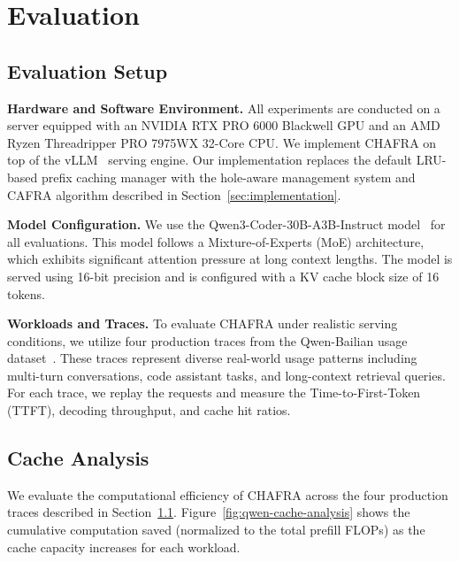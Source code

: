 \documentclass[letterpaper,twocolumn,10pt]{article}
\newcommand{\pgheading}[1]{\indent \textbf{#1.}}
\newcommand{\sys}{CHAFRA\xspace}
\newcommand{\algo}{CAFRA\xspace}
\begin{document}
\section{Evaluation}

\subsection{Evaluation Setup}
\label{sec:evaluation-setup}

\pgheading{Hardware and Software Environment}
All experiments are conducted on a server equipped with an NVIDIA RTX PRO 6000 Blackwell GPU and an AMD Ryzen Threadripper PRO 7975WX 32-Core CPU. We implement \sys on top of the vLLM~\cite{kwon2023efficient} serving engine. Our implementation replaces the default LRU-based prefix caching manager with the hole-aware management system and \algo algorithm described in Section~\ref{sec:implementation}.

\pgheading{Model Configuration}
We use the Qwen3-Coder-30B-A3B-Instruct model~\cite{qwen3technicalreport} for all evaluations. This model follows a Mixture-of-Experts (MoE) architecture, which exhibits significant attention pressure at long context lengths. The model is served using 16-bit precision and is configured with a KV cache block size of 16 tokens.

\pgheading{Workloads and Traces}
To evaluate \sys under realistic serving conditions, we utilize four production traces from the Qwen-Bailian usage dataset~\cite{qwen_bailian_traces}. These traces represent diverse real-world usage patterns including multi-turn conversations, code assistant tasks, and long-context retrieval queries. For each trace, we replay the requests and measure the Time-to-First-Token (TTFT), decoding throughput, and cache hit ratios.
\subsection{Cache Analysis}
\label{sec:cache-analysis}

We evaluate the computational efficiency of \sys across the four production traces described in Section~\ref{sec:evaluation-setup}. Figure~\ref{fig:qwen-cache-analysis} shows the cumulative computation saved (normalized to the total prefill FLOPs) as the cache capacity increases for each workload.
\end{document}
